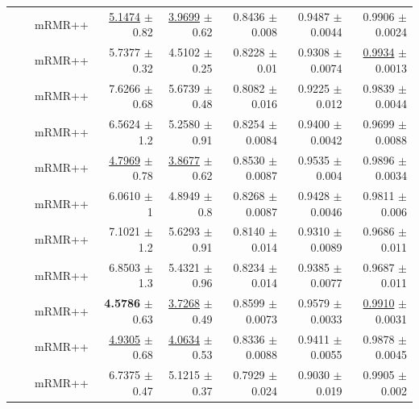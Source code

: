 \begin{longtable}{llp{}rrrrr}
 &  & mRMR++ & \underline{5.1474} {\scriptsize $\pm$ 0.82} & \underline{3.9699} {\scriptsize $\pm$ 0.62} & 0.8436 {\scriptsize $\pm$ 0.008} & 0.9487 {\scriptsize $\pm$ 0.0044} & 0.9906 {\scriptsize $\pm$ 0.0024} \\
 &  & mRMR++ & 5.7377 {\scriptsize $\pm$ 0.32} & 4.5102 {\scriptsize $\pm$ 0.25} & 0.8228 {\scriptsize $\pm$ 0.01} & 0.9308 {\scriptsize $\pm$ 0.0074} & \underline{0.9934} {\scriptsize $\pm$ 0.0013} \\
 &  & mRMR++ & 7.6266 {\scriptsize $\pm$ 0.68} & 5.6739 {\scriptsize $\pm$ 0.48} & 0.8082 {\scriptsize $\pm$ 0.016} & 0.9225 {\scriptsize $\pm$ 0.012} & 0.9839 {\scriptsize $\pm$ 0.0044} \\
 &  & mRMR++ & 6.5624 {\scriptsize $\pm$ 1.2} & 5.2580 {\scriptsize $\pm$ 0.91} & 0.8254 {\scriptsize $\pm$ 0.0084} & 0.9400 {\scriptsize $\pm$ 0.0042} & 0.9699 {\scriptsize $\pm$ 0.0088} \\
 &  & mRMR++ & \underline{4.7969} {\scriptsize $\pm$ 0.78} & \underline{3.8677} {\scriptsize $\pm$ 0.62} & 0.8530 {\scriptsize $\pm$ 0.0087} & 0.9535 {\scriptsize $\pm$ 0.004} & 0.9896 {\scriptsize $\pm$ 0.0034} \\
 &  & mRMR++ & 6.0610 {\scriptsize $\pm$ 1} & 4.8949 {\scriptsize $\pm$ 0.8} & 0.8268 {\scriptsize $\pm$ 0.0087} & 0.9428 {\scriptsize $\pm$ 0.0046} & 0.9811 {\scriptsize $\pm$ 0.006} \\
 &  & mRMR++ & 7.1021 {\scriptsize $\pm$ 1.2} & 5.6293 {\scriptsize $\pm$ 0.91} & 0.8140 {\scriptsize $\pm$ 0.014} & 0.9310 {\scriptsize $\pm$ 0.0089} & 0.9686 {\scriptsize $\pm$ 0.011} \\
 &  & mRMR++ & 6.8503 {\scriptsize $\pm$ 1.3} & 5.4321 {\scriptsize $\pm$ 0.96} & 0.8234 {\scriptsize $\pm$ 0.014} & 0.9385 {\scriptsize $\pm$ 0.0077} & 0.9687 {\scriptsize $\pm$ 0.011} \\
 &  & mRMR++ & \textbf{4.5786} {\scriptsize $\pm$ 0.63} & \underline{3.7268} {\scriptsize $\pm$ 0.49} & 0.8599 {\scriptsize $\pm$ 0.0073} & 0.9579 {\scriptsize $\pm$ 0.0033} & \underline{0.9910} {\scriptsize $\pm$ 0.0031} \\
 &  & mRMR++ & \underline{4.9305} {\scriptsize $\pm$ 0.68} & \underline{4.0634} {\scriptsize $\pm$ 0.53} & 0.8336 {\scriptsize $\pm$ 0.0088} & 0.9411 {\scriptsize $\pm$ 0.0055} & 0.9878 {\scriptsize $\pm$ 0.0045} \\
 &  & mRMR++ & 6.7375 {\scriptsize $\pm$ 0.47} & 5.1215 {\scriptsize $\pm$ 0.37} & 0.7929 {\scriptsize $\pm$ 0.024} & 0.9030 {\scriptsize $\pm$ 0.019} & 0.9905 {\scriptsize $\pm$ 0.002} \\

\end{longtable}

